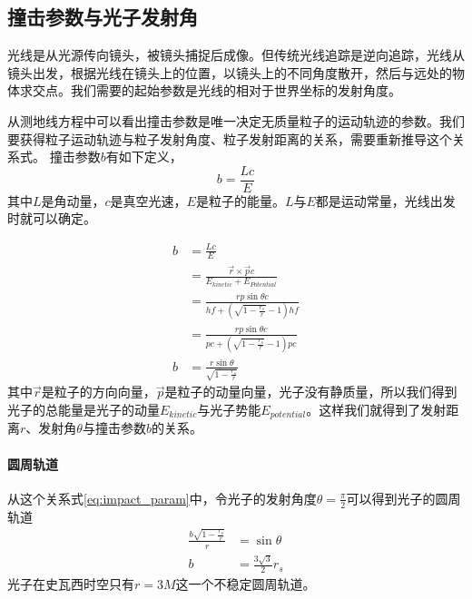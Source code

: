 \subsection{撞击参数与光子发射角}
光线是从光源传向镜头，被镜头捕捉后成像。但传统光线追踪是逆向追踪，光线从镜头出发，根据光线在镜头上的位置，以镜头上的不同角度散开，然后与远处的物体求交点。我们需要的起始参数是光线的相对于世界坐标的发射角度。

从测地线方程中可以看出撞击参数是唯一决定无质量粒子的运动轨迹的参数。我们要获得粒子运动轨迹与粒子发射角度、粒子发射距离的关系，需要重新推导这个关系式。
撞击参数$b$有如下定义，
\begin{equation}
    b=\frac{Lc}{E}
\end{equation}
其中$L$是角动量，$c$是真空光速，$E$是粒子的能量。$L$与$E$都是运动常量，光线出发时就可以确定。

\begin{equation}
    \begin{split}
        b&=\frac{Lc}{E}\\&=\frac{\vec{r}\times\vec{p}c}{E_{kinetic}+E_{Potential}}\\&=\frac{rp\sin\theta c}{hf+\left(\sqrt{1-\frac{r_{s}}{r}}-1\right)hf}\\&=\frac{rp\sin\theta c}{pc+\left(\sqrt{1-\frac{r_{s}}{r}}-1\right)pc}\\b&=\frac{r\sin\theta}{\sqrt{1-\frac{r_{s}}{r}}}\label{eq:impact_param}
    \end{split}
\end{equation}
其中$\vec{r}$是粒子的方向向量，$\vec{p}$是粒子的动量向量，光子没有静质量，所以我们得到光子的总能量是光子的动量$E_{kinetic}$与光子势能$E_{potential}$。这样我们就得到了发射距离$r$、发射角$\theta$与撞击参数$b$的关系。

\paragraph{圆周轨道}
从这个关系式\eqref{eq:impact_param}中，令光子的发射角度$\theta=\frac{\pi}{2}$可以得到光子的圆周轨道
\begin{equation*}
    \begin{split}
        \frac{b\sqrt{1-\frac{r_{s}}{r}}}{r}&=\sin\theta\\
        b&=\frac{3\sqrt{3}}{2}r_{s}\label{eq:circular_orbit}
    \end{split}
\end{equation*}
光子在史瓦西时空只有$r=3M$这一个不稳定圆周轨道。

